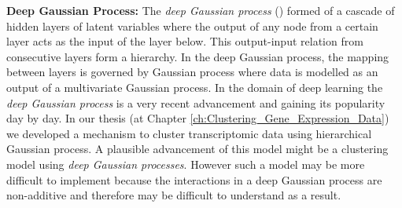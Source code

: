\textbf{Deep Gaussian Process:} The \emph{deep Gaussian process} (\cite{Damianou:2013}) formed of a cascade of hidden layers of latent variables where the output of any node from a certain layer acts as the input of the layer below. This output-input relation from consecutive layers form a hierarchy. In the deep Gaussian process, the mapping between layers is governed by Gaussian process where data is modelled as an output of a multivariate Gaussian process. In the domain of deep learning the \emph{deep Gaussian process} is a very recent advancement and gaining its popularity day by day. In our thesis (at Chapter \ref{ch:Clustering_Gene_Expression_Data}) we developed a mechanism to cluster transcriptomic data using hierarchical Gaussian process. A plausible advancement of this model might be a clustering model using \emph{deep Gaussian processes}. However such a model may be more difficult to implement because the interactions in a deep Gaussian process are non-additive and therefore may be difficult to understand as a result.


